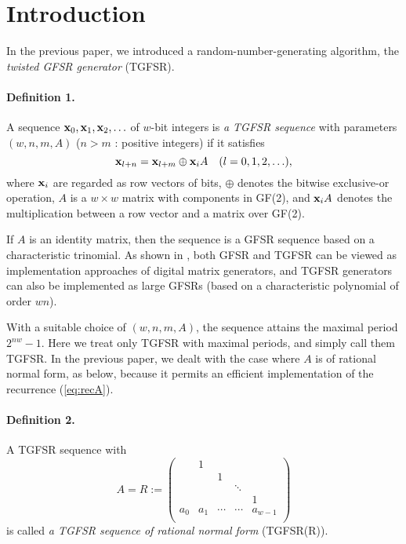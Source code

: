 \section{Introduction}
In the previous paper\cite{matsumoto}, we introduced  
a random-number-generating algorithm, 
the {\em twisted GFSR generator} (TGFSR).
\paragraph{Definition 1.}
A sequence
${\bf x}_0,{\bf x}_1,{\bf x}_2,\ldots$
of $w$-bit integers is 
{\em a TGFSR sequence} with parameters
$(w,n,m,A)$ 
($n>m$ : positive integers)
if it satisfies
\begin{equation}
 {\bf x}_{l+n} = {\bf x}_{l+m} \oplus {\bf x}_iA \quad (l=0,1,2,\ldots),
 \label{eq:recA}
\end{equation}
where ${\bf x}_i$ are regarded as row vectors of bits,
$\oplus$ denotes the bitwise exclusive-or
operation,
$A$ is a 
$w\times w$ matrix with components in GF(2),
and ${\bf x}_iA$ denotes the multiplication
between a row vector and a matrix over GF(2). 
\vskip 3mm

If $A$ is an identity matrix, then the sequence is
a GFSR sequence based on a characteristic trinomial.
As shown in \cite[\S\S3.7, \S\S3.8]{lecuyer2},
both GFSR and TGFSR can be viewed as implementation
approaches of digital matrix generators, and TGFSR generators
can also be implemented as large GFSRs (based on a characteristic
polynomial of order $wn$).

With a suitable choice of $(w,n,m,A)$, 
the sequence
attains the maximal period $2^{nw}-1$.
Here we treat only TGFSR with maximal periods, and simply call them
TGFSR.
In the previous paper, we dealt with
the case where $A$ is of rational normal form, as below,
because it permits an efficient implementation of
the recurrence (\ref{eq:recA}).

\paragraph{Definition 2.}
A TGFSR sequence with 
\[
   A=R:=\left(
   \begin{array}{ccccc}
                      &   1    &        &        &          \\
                      &        &   1    &        &          \\
                      &        &        & \ddots &          \\
                      &        &        &        &    1     \\
          a_0         &   a_1  & \cdots & \cdots & a_{w-1} \\

   \end{array}
   \right)
\]
is called {\em a TGFSR sequence of rational normal form}
(TGFSR(R)).
\vskip 3mm

